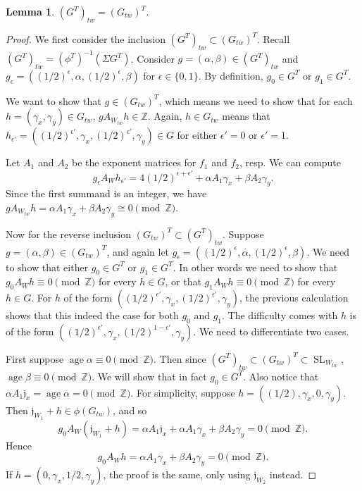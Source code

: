 \documentclass[10pt, letterpaper]{amsart}
\newtheorem{lem}[thm]{Lemma}
\theoremstyle{remark}
\newcommand{\ZZ}{\mathbb{Z}}
\newcommand{\jw}{\mathfrak{j}}
\newcommand{\set}[1]{\{#1\}}
\newcommand{\tw}[1]{{#1}_{tw}}
\newcommand{\s}[1]{\Sigma #1}
\DeclareMathOperator{\SL}{SL}
\DeclareMathOperator{\age}{age}
\begin{document}
\begin{lem}
$\tw{(G^T)} = (\tw{G})^T$. 
\end{lem}
\begin{proof}
We first consider the inclusion $\tw{(G^T)}\subset (\tw{G})^T$. Recall $\tw{(G^T)}=(\phi^T)^{-1}(\s{G^T})$. Consider $g=(\alpha, \beta)\in \tw{(G^T)}$ and $g_\epsilon=((1/2)^{\epsilon},\alpha,(1/2)^{\epsilon},\beta)$ for $\epsilon\in\set{0,1}$. By definition, $g_0\in G^T$ or $g_1\in G^T$. 

We want to show that $g\in (\tw{G})^T$, which means we need to show that for each $h=(\gamma_x,\gamma_y)\in \tw{G}$, $gA_{\tw{W}}h\in \ZZ$. Again, $h\in \tw{G}$ means that $h_{\epsilon'}=((1/2)^{\epsilon'},\gamma_x,(1/2)^{\epsilon'},\gamma_y)\in G$ for either $\epsilon'=0$ or $\epsilon'=1$.

Let $A_1$ and $A_2$ be the exponent matrices for $f_1$ and $f_2$, resp. We can compute 
\[
g_\epsilon A_{W}h_{\epsilon'}= 4(1/2)^{\epsilon+\epsilon'}+\alpha A_{1}\gamma_x+\beta A_{2}\gamma_y.
\]
Since the first summand is an integer, we have $gA_{\tw{W}}h=\alpha A_{1}\gamma_x+\beta A_{2}\gamma_y \cong 0 \pmod \ZZ$. 

Now for the reverse inclusion $(\tw{G})^T\subset \tw{(G^T)}$. Suppose $g=(\alpha,\beta)\in (\tw{G})^T$, and again let $g_\epsilon= ((1/2)^{\epsilon},\alpha,(1/2)^{\epsilon},\beta)$. We need to show that either $g_0\in G^T$ or $g_1\in G^T$. In other words we need to show that $g_0A_{W}h\equiv 0\pmod \ZZ$ for every $h\in G$, or that $g_1A_{W}h\equiv 0\pmod \ZZ$ for every $h\in G$. For $h$ of the form $((1/2)^{\epsilon'},\gamma_x,(1/2)^{\epsilon'},\gamma_y)$, the previous calculation shows that this indeed the case for both $g_0$ and $g_1$. The difficulty comes with $h$ is of the form $((1/2)^{\epsilon'},\gamma_x,(1/2)^{1-\epsilon'},\gamma_y)$. We need to differentiate two cases. 

First suppose $\age \alpha\equiv 0 \pmod \ZZ$. Then since $\tw{(G^T)}\subset (\tw{G})^T\subset \SL_{\tw{W}}$, $\age \beta\equiv 0 \pmod \ZZ$. We will show that in fact $g_0\in G^T$. Also notice that $\alpha A_1\jw_x=\age \alpha=0\pmod \ZZ$. For simplicity, suppose $h=((1/2),\gamma_x,0,\gamma_y)$. Then $\jw_{W_1}+h\in \phi(\tw{G})$, and so 
\[
g_0 A_W (\jw_{W_1}+h)=\alpha A_1 \jw_x + \alpha A_1 \gamma_x + \beta A_2 \gamma_y=0\pmod \ZZ.
\]
Hence
\[
g_0 A_W h= \alpha A_1 \gamma_x + \beta A_2 \gamma_y =0\pmod \ZZ.
\]
If $h=(0,\gamma_x,1/2,\gamma_y)$, the proof is the same, only using $\jw_{W_2}$ instead. 


\end{proof}
\end{document}
